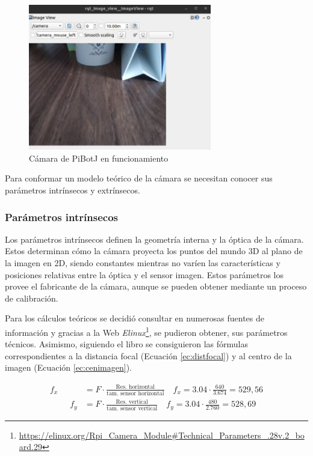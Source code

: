  \begin{figure} [h!]
	\begin{center}
		\includegraphics[width=8cm]{figs/cap6/camerarr.png}
	\end{center}
	\caption{Cámara de PiBotJ en funcionamiento}
	\label{fig:camararr}
\end{figure}

Para conformar un modelo teórico de la cámara se necesitan conocer sus parámetros intrínsecos y extrínsecos.

\subsubsection{Parámetros intrínsecos}
\label{subsubsec:intrinsecoscamara}

Los parámetros intrínsecos definen la geometría interna y la óptica de la cámara. Estos determinan cómo la cámara proyecta los puntos del mundo 3D al plano de la imagen en 2D, siendo constantes mientras no varíen las características y posiciones relativas entre la óptica y el sensor imagen. Estos parámetros los provee el fabricante de la cámara, aunque se pueden obtener mediante un proceso de calibración.

Para los cálculos teóricos se decidió consultar en numerosas fuentes de información y gracias a la Web \textit{Elinux}\footnote{\url{https://elinux.org/Rpi_Camera_Module\#Technical_Parameters_.28v.2_board.29}}, se pudieron obtener, sus parámetros técnicos. Asimismo, siguiendo el libro \cite{Hartley2004} se consiguieron las fórmulas correspondientes a la distancia focal (Ecuación \ref{ec:distfocal}) y al centro de la imagen (Ecuación \ref{ec:cenimagen}).


\begin{myequation}[h]
	\begin{align}
		f_x &= F \cdot \frac{\text{Res. horizontal}}{\text{tam. sensor horizontal}} \quad
		f_x = 3.04 \cdot \frac{640}{3.674} = 529,56 
		\nonumber\\
		\hspace{1cm}
		f_y &= F \cdot \frac{\text{Res. vertical}}{\text{tam. sensor vertical}} \quad
		f_y = 3.04 \cdot \frac{480}{2.760} = 528,69
		\nonumber
	\end{align}
	\caption[Fórmula para calcular la distancia focal teórica]{Fórmula para calcular la distancia focal teórica}
	\label{ec:distfocal}
\end{myequation}

